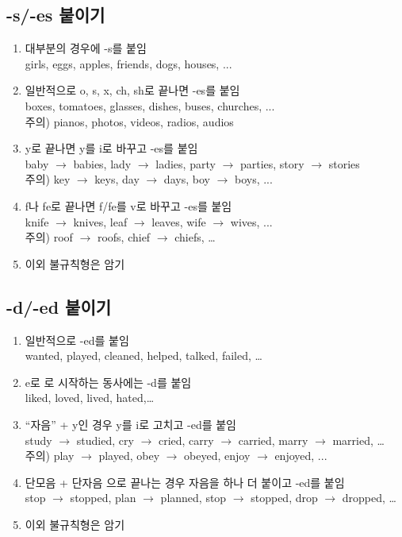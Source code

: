 \documentclass[a4paper, 12pt, twocolumn]{oblivoir}
\begin{document}
    \subsection{-s/-es 붙이기}
    \begin{enumerate}
        \item 대부분의 경우에 -s를 붙임 \\ girls, eggs, apples, friends, dogs, houses, ...
        \item 일반적으로 o, s, x, ch, sh로 끝나면 -es를 붙임 \\ boxes, tomatoes, glasses, dishes, buses, churches, ... \\
                주의) pianos, photos, videos, radios, audios
        \item y로 끝나면 y를 i로 바꾸고 -es를 붙임 \\ baby $\rightarrow$ babies, lady $\rightarrow$ ladies, party $\rightarrow$ parties, story $\rightarrow$ stories \\
                주의) key $\rightarrow$ keys, day $\rightarrow$ days, boy $\rightarrow$ boys, ...
        \item f나 fe로 끝나면 f/fe를 v로 바꾸고 -es를 붙임 \\ knife $\rightarrow$ knives, leaf $\rightarrow$ leaves, wife $\rightarrow$ wives, ... \\
                주의) roof $\rightarrow$ roofs, chief $\rightarrow$ chiefs, \dots
        \item 이외 불규칙형은 암기 
        
    \end{enumerate}
    \subsection{-d/-ed 붙이기}
    \begin{enumerate}
        \item 일반적으로 -ed를 붙임 \\ wanted, played, cleaned, helped, talked, failed, \dots
        \item e로 로 시작하는 동사에는 -d를 붙임 \\ liked, loved, lived, hated,\dots
        \item ``자음'' + y인 경우 y를 i로 고치고 -ed를 붙임 \\ study $\rightarrow$ studied, cry $\rightarrow$ cried, carry $\rightarrow$ carried, marry $\rightarrow$ married, \dots \\
                주의) play $\rightarrow$ played, obey $\rightarrow$ obeyed, enjoy $\rightarrow$ enjoyed, ... 
        \item 단모음 + 단자음 으로 끝나는 경우 자음을 하나 더 붙이고 -ed를 붙임 \\ stop $\rightarrow$ stopped, plan $\rightarrow$ planned, stop $\rightarrow$ stopped, drop $\rightarrow$ dropped, \dots
        \item 이외 불규칙형은 암기 
    \end{enumerate}
\end{document}
